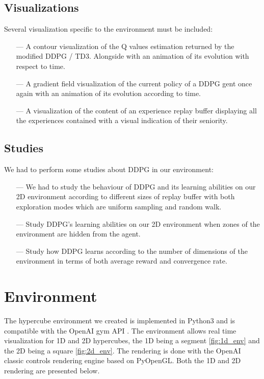 \documentclass{article}
\begin{document}
\subsection{Visualizations}

 Several visualization specific to the environment must be included:

\begin{itemize}
    \item[---] A contour visualization of the Q values estimation returned by the modified DDPG / TD3. Alongside with an animation of its evolution with respect to time.
    \item[---] A gradient field visualization of the current policy of a DDPG gent once again with an animation of its evolution according to time.
    \item[---] A visualization of the content of an experience replay buffer displaying all the experiences contained with a visual indication of their seniority.
\end{itemize}

\subsection{Studies}

We had to perform some studies about DDPG in our environment:
\begin{itemize}
    \item[---] We had to study the behaviour of DDPG and its learning abilities on our 2D environment according to different sizes of replay buffer with both exploration modes which are uniform sampling and random walk.
    \item[---] Study DDPG's learning abilities on our 2D environment when zones of the environment are hidden from the agent.
    \item[---] Study how DDPG learns according to the number of dimensions of the environment in terms of both average reward and convergence rate.
\end{itemize}

\section{Environment}

The hypercube environment we created is implemented in Python3 and is compatible with the OpenAI gym API \cite{noauthor_toolkit_2019}. The environment allows real time visualization for 1D and 2D hypercubes, the 1D being a segment \ref{fig:1d_env} and the 2D being a square \ref{fig:2d_env}. The rendering is done with the OpenAI classic controls rendering engine based on PyOpenGL. Both the 1D and 2D rendering are presented below.
\end{document}
